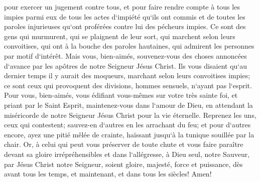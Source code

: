 \verse pour exercer un jugement contre tous, et pour faire rendre compte à tous les impies parmi eux de tous les actes d`impiété qu`ils ont commis et de toutes les paroles injurieuses qu`ont proférées contre lui des pécheurs impies. 
\verse Ce sont des gens qui murmurent, qui se plaignent de leur sort, qui marchent selon leurs convoitises, qui ont à la bouche des paroles hautaines, qui admirent les personnes par motif d`intérêt. 
\verse Mais vous, bien-aimés, souvenez-vous des choses annoncées d`avance par les apôtres de notre Seigneur Jésus Christ. 
\verse Ils vous disaient qu`au dernier temps il y aurait des moqueurs, marchant selon leurs convoitises impies; 
\verse ce sont ceux qui provoquent des divisions, hommes sensuels, n`ayant pas l`esprit. 
\verse Pour vous, bien-aimés, vous édifiant vous-mêmes sur votre très sainte foi, et priant par le Saint Esprit, 
\verse maintenez-vous dans l`amour de Dieu, en attendant la miséricorde de notre Seigneur Jésus Christ pour la vie éternelle. 
\verse Reprenez les uns, ceux qui contestent; 
\verse sauvez-en d`autres en les arrachant du feu; et pour d`autres encore, ayez une pitié mêlée de crainte, haïssant jusqu`à la tunique souillée par la chair. 
\verse Or, à celui qui peut vous préserver de toute chute et vous faire paraître devant sa gloire irrépréhensibles et dans l`allégresse, 
\verse à Dieu seul, notre Sauveur, par Jésus Christ notre Seigneur, soient gloire, majesté, force et puissance, dès avant tous les temps, et maintenant, et dans tous les siècles! Amen! 
